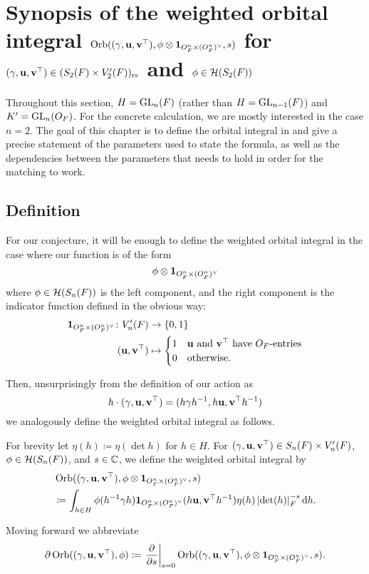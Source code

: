 \section{Synopsis of the weighted orbital integral
  $\operatorname{Orb}((\gamma, \mathbf u, \mathbf v^\top), \phi \otimes \mathbf{1}_{O_F^n \times (O_F^n)^\vee}, s)$
  for $(\gamma, \mathbf u, \mathbf v^\top) \in (S_2(F) \times V'_2(F))_{\mathrm{rs}}$
  and $\phi \in \mathcal H(S_2(F))$}
\label{ch:orbitalFJ0}

Throughout this section, $H = \operatorname{GL}_n(F)$ (rather than $H = \operatorname{GL}_{n-1}(F)$)
and $K' = \operatorname{GL}_n(O_F)$.
For the concrete calculation, we are mostly interested in the case $n = 2$.
The goal of this chapter is to define the orbital integral in
 and give a precise statement
of the parameters used to state the formula,
as well as the dependencies between the parameters that needs to hold
in order for the matching to work.

\subsection{Definition}
For our conjecture, it will be enough to define the weighted orbital integral
in the case where our function is of the form
\[ \phi \otimes \mathbf{1}_{O_F^n \times (O_F^n)^\vee} \]
where $\phi \in \mathcal H(S_n(F))$ is the left component, and
the right component is the indicator function defined in the obvious way:
\begin{align*}
  \mathbf{1}_{O_F^n \times (O_F^n)^\vee} \colon V'_n(F) &\to \{0,1\} \\
  (\mathbf u, \mathbf v^\top) &\mapsto
  \begin{cases}
    1 & \mathbf u \text{ and } \mathbf v^\top \text{ have } O_F \text{-entries} \\
    0 & \text{otherwise}.
  \end{cases}
\end{align*}

Then, unsurprisingly from the definition of our action as
\[ h \cdot {(\gamma, \mathbf u, \mathbf v^\top)} = (h\gamma h^{-1}, h\mathbf u, \mathbf v^\top h^{-1}) \]
we analogously define the weighted orbital integral as follows.
\begin{definition}
  \label{def:orbitalFJ}
  For brevity let $\eta(h) \coloneqq \eta(\det h)$ for $h \in H$.
  For ${(\gamma, \mathbf u, \mathbf v^\top)} \in S_n(F) \times V'_n(F)$,
  $\phi \in \mathcal H(S_n(F))$, and $s \in \mathbb C$,
  we define the weighted orbital integral by
  \begin{align*}
    & \Orb(\guv, \phi \otimes \oneV, s) \\
    &\coloneqq \int_{h \in H} \phi(h\inv \gamma h) \oneV(h \uu, \vv^\top h^{-1})
    \eta(h) \left\lvert \det(h) \right\rvert_F^{-s} \odif h.
  \end{align*}
\end{definition}
\begin{definition}
  Moving forward we abbreviate
  \[ \partial \operatorname{Orb}({(\gamma, \mathbf u, \mathbf v^\top)}, \phi) \coloneqq
    \left. \pdv{}{s} \right\rvert_{s=0}
    \operatorname{Orb}((\gamma, \mathbf u, \mathbf v^\top), \phi \otimes \mathbf{1}_{O_F^n \times (O_F^n)^\vee}, s). \]
\end{definition}

